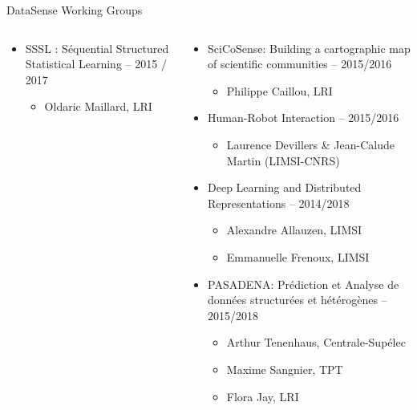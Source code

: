 \begin{frame}{DataSense Working Groups}
\begin{columns}
\begin{column}[t]{6cm}
\begin{itemize}
        \item SSSL : Séquential Structured Statistical Learning – 2015 / 2017
          \begin{itemize}
          \item Oldaric Maillard, LRI
          \end{itemize}
      \end{itemize}    
    \end{column}
    \begin{column}[t]{6.5cm}
      \begin{itemize}    
      \item SciCoSense: Building a cartographic map of scientific communities -- 2015/2016
        \begin{itemize}
        \item Philippe Caillou, LRI
        \end{itemize}

      \item Human-Robot Interaction -- 2015/2016
        \begin{itemize}
        \item Laurence Devillers \& Jean-Calude Martin (LIMSI-CNRS) 
        \end{itemize}

      \item Deep Learning and Distributed Representations -- 2014/2018
        \begin{itemize}
        \item Alexandre Allauzen, LIMSI 
        \item Emmanuelle Frenoux, LIMSI 
        \end{itemize}

      \item PASADENA: Prédiction et Analyse de données structurées et hétérogènes -- 2015/2018
        \begin{itemize}
          \item Arthur Tenenhaus, Centrale-Supélec
          \item Maxime Sangnier, TPT 
          \item Flora Jay, LRI
        \end{itemize}

      \end{itemize}
    \end{column}
  \end{columns}
\end{frame}

